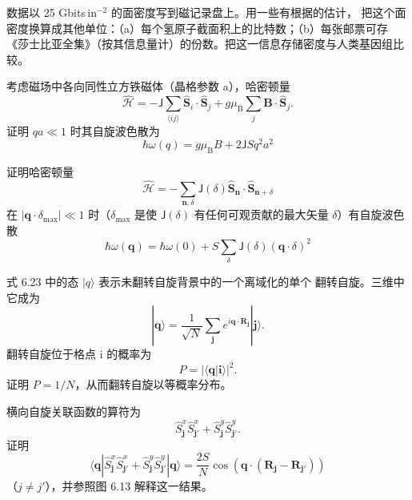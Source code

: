  数据以 25 Gbits\,in$^{-2}$ 的面密度写到磁记录盘上。用一些有根据的估计，
把这个面密度换算成其他单位：（a）每个氢原子截面积上的比特数；（b）每张邮票可存
《莎士比亚全集》（按其信息量计）的份数。把这一信息存储密度与人类基因组比较。

 考虑磁场中各向同性立方铁磁体（晶格参数 a），哈密顿量
\begin{equation*}
\hat{\mathcal{H}} = -\mathsf{J}\sum_{\langle ij\rangle}\hat{\mathbf{S}}_i\cdot\hat{\mathbf{S}}_j + g\mu_{\mathrm{B}}\sum_j\mathbf{B}\cdot\hat{\mathbf{S}}_j.\tag{6.63}
\end{equation*}
证明 $qa\ll1$ 时其自旋波色散为
\begin{equation*}
\hbar\omega(q) = g\mu_{\mathrm{B}}B + 2\mathsf{J}Sq^{2}a^{2}\tag{6.64}
\end{equation*}

 证明哈密顿量
\begin{equation*}
\hat{\mathcal{H}} = -\sum_{\mathbf{n},\delta}\mathsf{J}(\delta)\hat{\mathbf{S}}_{\mathbf{n}}\cdot\hat{\mathbf{S}}_{\mathbf{n}+\delta}\tag{6.65}
\end{equation*}
在 $|\mathbf{q}\cdot\delta_{\max}|\ll1$ 时（$\delta_{\max}$ 是使 $\mathsf{J}(\delta)$
有任何可观贡献的最大矢量 $\delta$）有自旋波色散
\begin{equation*}
\hbar\omega(\mathbf{q}) = \hbar\omega(0) + S\sum_{\delta}\mathsf{J}(\delta)(\mathbf{q}\cdot\delta)^{2}\tag{6.66}
\end{equation*}

 式 6.23 中的态 $|q\rangle$ 表示未翻转自旋背景中的一个离域化的单个
翻转自旋。三维中它成为
\begin{equation*}
|\mathbf{q}\rangle = \frac{1}{\sqrt{N}}\sum_{\mathbf{j}}e^{i\mathbf{q}\cdot\mathbf{R}_{\mathbf{j}}}|\mathbf{j}\rangle.\tag{6.67}
\end{equation*}
翻转自旋位于格点 i 的概率为
\begin{equation*}
P = |\langle\mathbf{q}|\mathbf{i}\rangle|^{2}.\tag{6.68}
\end{equation*}
证明 $P=1/N$，从而翻转自旋以等概率分布。

横向自旋关联函数的算符为
\begin{equation*}
\hat{S}_{\mathbf{j}}^{x}\hat{S}_{\mathbf{j}'}^{x} + \hat{S}_{\mathbf{j}}^{y}\hat{S}_{\mathbf{j}'}^{y}.\tag{6.69}
\end{equation*}
证明
\begin{equation*}
\langle\mathbf{q}|\hat{S}_{\mathbf{j}}^{x}\hat{S}_{\mathbf{j}'}^{x}+\hat{S}_{\mathbf{j}}^{y}\hat{S}_{\mathbf{j}'}^{y}|\mathbf{q}\rangle = \frac{2S}{N}\cos(\mathbf{q}\cdot(\mathbf{R}_{\mathbf{j}}-\mathbf{R}_{\mathbf{j}'}))\tag{6.70}
\end{equation*}
（$j\neq j'$），并参照图 6.13 解释这一结果。

